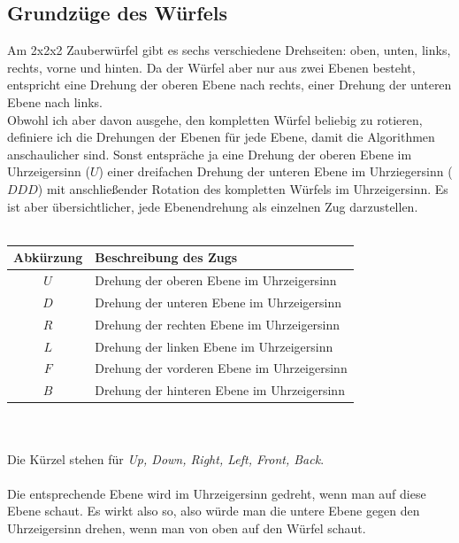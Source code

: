 \documentclass[12pt,a4paper, usenames, dvipsnames]{article}
\begin{document}
\subsection*{Grundzüge des Würfels} 
Am 2x2x2 Zauberwürfel gibt es sechs verschiedene Drehseiten: oben, unten, links, rechts, vorne und hinten. Da der Würfel aber nur aus zwei Ebenen besteht, entspricht eine Drehung der oberen Ebene nach rechts, einer Drehung der unteren Ebene nach links. \\
Obwohl ich aber davon ausgehe, den kompletten Würfel beliebig zu rotieren, definiere ich die Drehungen der Ebenen für jede Ebene, damit die Algorithmen anschaulicher sind. Sonst entspräche ja eine Drehung der oberen Ebene im Uhrzeigersinn ($U$) einer dreifachen Drehung der unteren Ebene im Uhrziegersinn ($DDD$) mit anschließender Rotation des kompletten Würfels im Uhrzeigersinn. Es ist aber übersichtlicher, jede Ebenendrehung als einzelnen Zug darzustellen. \\
\\
\begin{tabular}{|c|l|}
\hline
Abkürzung & Beschreibung des Zugs \\
\hline
\hline
$U$ & Drehung der oberen Ebene im Uhrzeigersinn \\
\hline
$D$ & Drehung der unteren Ebene im Uhrzeigersinn \\
\hline
$R$ & Drehung der rechten Ebene im Uhrzeigersinn \\
\hline
$L$ & Drehung der linken Ebene im Uhrzeigersinn \\%
\hline
$F$ & Drehung der vorderen Ebene im Uhrzeigersinn \\
\hline
$B$ & Drehung der hinteren Ebene im Uhrzeigersinn \\
\hline
\end{tabular} \\
\\
Die Kürzel stehen für \textit{Up, Down, Right, Left, Front, Back}.  \\
\\
Die entsprechende Ebene wird im Uhrzeigersinn gedreht, wenn man auf diese Ebene schaut. Es wirkt also so, also würde man die untere Ebene gegen den Uhrzeigersinn drehen, wenn man von oben auf den Würfel schaut. 
\newpage










\end{document}

